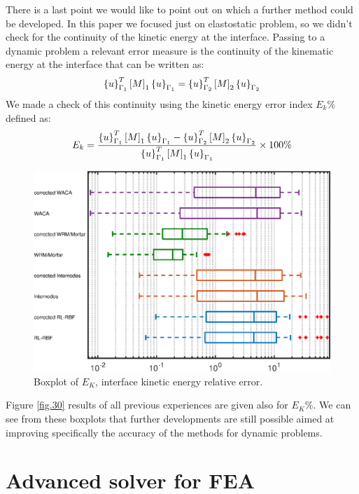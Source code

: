  
 
 \newpage
 
      There is a last point we would like to point out on which a further method could be developed. In this paper we focused just on elastostatic problem, so we didn't check for the continuity of the kinetic energy at the interface. Passing to a dynamic problem a relevant error measure is the continuity of the kinematic energy at the interface that can be written as:
 \begin{equation}
 \label{eq.90}
 \left\lbrace{u}\right \rbrace_{\Gamma_1}^{T}\left[{M}\right]_1\left\lbrace{u}\right \rbrace_{\Gamma_1}=\left\lbrace{u}\right \rbrace_{\Gamma_2}^{T}\left[{M}\right]_2\left\lbrace{u}\right \rbrace_{\Gamma_2}
 \end{equation}
 We made a check of this continuity using the kinetic energy error index $E_k \%$ defined as:
 \begin{equation}
 \label{eq.91}
 E_k =\frac{\left\lbrace{u}\right \rbrace_{\Gamma_1}^{T}\left[{M}\right]_1\left\lbrace{u}\right \rbrace_{\Gamma_1}-\left\lbrace{u}\right \rbrace_{\Gamma_2}^{T}\left[{M}\right]_2\left\lbrace{u}\right \rbrace_{\Gamma_2}}{\left\lbrace{u}\right \rbrace_{\Gamma_1}^{T}\left[{M}\right]_1\left\lbrace{u}\right \rbrace_{\Gamma_1}}\times 100 \%
 \end{equation}
 \begin{figure}
 \centering
 \includegraphics[width=0.7\linewidth]{images/Ch1/boxplot_EK}
 \caption{Boxplot of $E_K$, interface kinetic energy relative error.\label{fig.30}}
 \label{fig:boxplot_EK}
 \end{figure}
 
 Figure \ref{fig.30} results of all previous experiences are given also for $E_K \%$. We can see from these boxplots that further developments are still possible aimed at improving specifically the accuracy of the methods for dynamic problems.
\section{Advanced solver for FEA}
